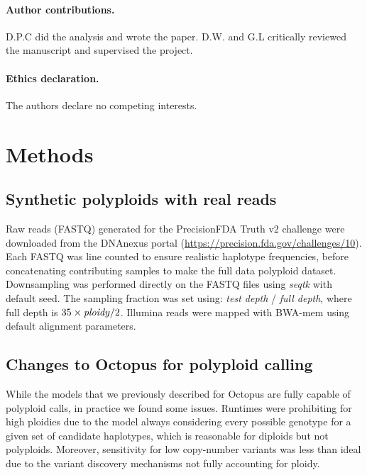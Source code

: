 \documentclass[notitlepage, twocolumn, 10pt]{article}
\begin{document}
\paragraph*{Author contributions.} D.P.C did the analysis and wrote the paper. D.W. and G.L critically reviewed the manuscript and supervised the project.

\paragraph*{Ethics declaration.} The authors declare no competing interests.




\section*{Methods}\small

\subsection*{Synthetic polyploids with real reads} Raw reads (FASTQ) generated for the PrecisionFDA Truth v2 challenge \cite{RN809} were downloaded from the DNAnexus portal (\url{https://precision.fda.gov/challenges/10}). Each FASTQ was line counted to ensure realistic haplotype frequencies, before concatenating contributing samples to make the full data polyploid dataset. Downsampling was performed directly on the FASTQ files using \emph{seqtk} with default seed. The sampling fraction was set using: \emph{test depth} / \emph{full depth}, where full depth is $35 \times \text{\emph{ploidy}} / 2$. Illumina reads were mapped with BWA-mem using default alignment parameters.

\subsection*{Changes to Octopus for polyploid calling}

While the models that we previously described for Octopus \cite{RN663} are fully capable of polyploid calls, in practice we found some issues. Runtimes were prohibiting for high ploidies due to the model always considering every possible genotype for a given set of candidate haplotypes, which is reasonable for diploids but not polyploids. Moreover, sensitivity for low copy-number variants was less than ideal due to the variant discovery mechanisms not fully accounting for ploidy.
\end{document}

